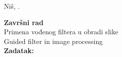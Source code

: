 \documentclass[a4paper,12pt,titlepage]{article}
\begin{document}
\begin{titlepage}
    \vspace{1cm}
   
    
    
        
   
  
    
    
     \begin{center}
        Niš, \the\year.
    \end{center}
\end{titlepage}

\vspace{2cm}

\noindent
\textbf{Završni rad}\\


\noindent
Primena vođenog filtera u obradi slike \\


\noindent
Guided filter in image processing\\


   \noindent
    \textbf{Zadatak:}
    
\end{document}
